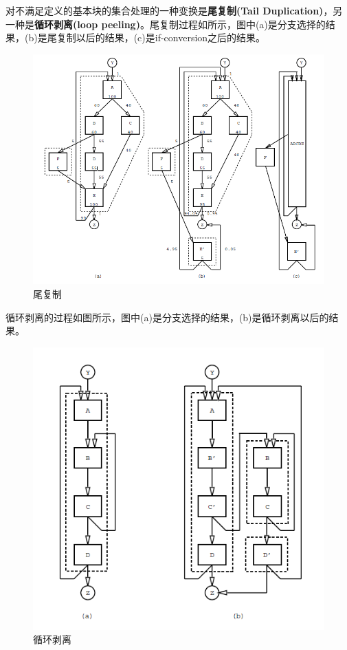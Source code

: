 对不满足定义的基本块的集合处理的一种变换是\textbf{尾复制(Tail Duplication)}，另一种是\textbf{循环剥离(loop peeling)}。尾复制过程如所示，图中(a)是分支选择的结果，(b)是尾复制以后的结果，(c)是if-conversion之后的结果。
\begin{figure}
\includegraphics[width=\linewidth]{hyperblock-td}
\caption{\label{fig:taildup} 尾复制}
\end{figure}

循环剥离的过程如图所示，图中(a)是分支选择的结果，(b)是循环剥离以后的结果。
\begin{figure}
\includegraphics[width=\linewidth]{hyperblock-lp}
\caption{\label{fig:looppeeling} 循环剥离}
\end{figure}

